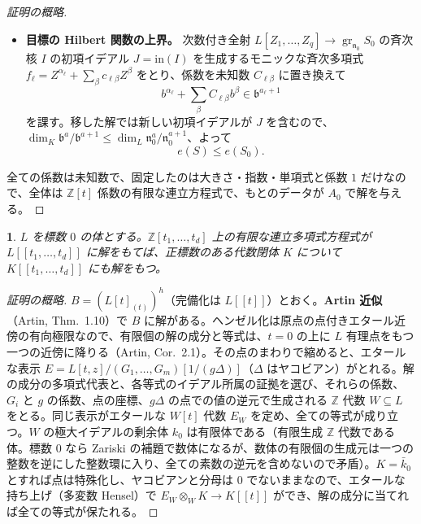 \documentclass[11pt,a4paper]{ltjsarticle}
\newcommand{\stmtname}{}
\theoremstyle{plain}
\newtheorem*{stmtgen}{\stmtname}
\newenvironment{stmt}[1]{\renewcommand{\stmtname}{#1}\begin{stmtgen}}{\end{stmtgen}}
\theoremstyle{definition}
\newcommand{\n}{\mathfrak{n}}
\newcommand{\bb}{\mathfrak{b}}
\newcommand{\gr}{\operatorname{gr}}
\newcommand{\Z}{\mathbb{Z}}
\begin{document}
\begin{proof}[証明の概略]
\begin{itemize}
\begin{equation}
  \end{equation}
  \item \textbf{目標の Hilbert 関数の上界。} 次数付き全射 $L[Z_1,\dots,Z_q]\to\gr_{\n_0}S_0$ の斉次核 $I$ の初項イデアル $J = \mathrm{in}(I)$ を生成するモニックな斉次多項式 $f_\ell = Z^{\alpha_\ell}+\sum_\beta c_{\ell\beta}Z^\beta$ をとり、係数を未知数 $C_{\ell\beta}$ に置き換えて
  \begin{equation}\tag{7.5}
    b^{\alpha_\ell}+\sum_{\beta}C_{\ell\beta}b^\beta\in\bb^{a_\ell+1}
  \end{equation}
  を課す。移した解では新しい初項イデアルが $J$ を含むので、$\dim_K\bb^a/\bb^{a+1}\le\dim_L\n_0^a/\n_0^{a+1}$、よって
  \begin{equation}\tag{7.6}
    e(S)\le e(S_0).
  \end{equation}
\end{itemize}
全ての係数は未知数で、固定したのは大きさ・指数・単項式と係数 $1$ だけなので、全体は $\Z[t]$ 係数の有限な連立方程式で、もとのデータが $A_0$ で解を与える。
\end{proof}

\begin{stmt}{補題 7.3}
$L$ を標数 $0$ の体とする。$\Z[t_1,\dots,t_d]$ 上の有限な連立多項式方程式が $L[[t_1,\dots,t_d]]$ に解をもてば、正標数のある代数閉体 $K$ について $K[[t_1,\dots,t_d]]$ にも解をもつ。
\end{stmt}
\begin{proof}[証明の概略]
$B = (L[t]_{(t)})^h$（完備化は $L[[t]]$）とおく。\textbf{Artin 近似}（Artin, Thm.~1.10）で $B$ に解がある。ヘンゼル化は原点の点付きエタール近傍の有向極限なので、有限個の解の成分と等式は、$t = 0$ の上に $L$ 有理点をもつ一つの近傍に降りる（Artin, Cor.~2.1）。その点のまわりで縮めると、エタールな表示 $E = L[t,z]/(G_1,\dots,G_m)[1/(g\Delta)]$（$\Delta$ はヤコビアン）がとれる。解の成分の多項式代表と、各等式のイデアル所属の証拠を選び、それらの係数、$G_i$ と $g$ の係数、点の座標、$g\Delta$ の点での値の逆元で生成される $\Z$ 代数 $W\subseteq L$ をとる。同じ表示がエタールな $W[t]$ 代数 $E_W$ を定め、全ての等式が成り立つ。$W$ の極大イデアルの剰余体 $k_0$ は有限体である（有限生成 $\Z$ 代数である体。標数 $0$ なら Zariski の補題で数体になるが、数体の有限個の生成元は一つの整数を逆にした整数環に入り、全ての素数の逆元を含めないので矛盾）。$K = \bar k_0$ とすれば点は特殊化し、ヤコビアンと分母は $0$ でないままなので、エタールな持ち上げ（多変数 Hensel）で $E_W\otimes_WK\to K[[t]]$ ができ、解の成分に当てれば全ての等式が保たれる。
\end{proof}
\end{document}
